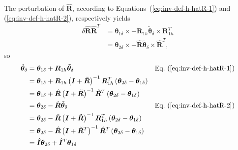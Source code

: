 \documentclass[10pt,dvips,fleqn,subeqn]{report}
\newcommand{\T}[1]{\bm{#1}}
\begin{document}
The perturbation of $\hat{\T{R}}$, according 
to Equations~(\ref{eq:inv-def-h-hatR-1}) and (\ref{eq:inv-def-h-hatR-2}),
respectively yields
\begin{align}
	\delta\hat{\T{R}} \hat{\T{R}}^T
	&= \T{\theta}_{1\delta} \times
		+ \T{R}_{1h} \tilde{\T{\theta}}_{\delta}\times \T{R}_{1h}^T \nonumber \\
	&= \T{\theta}_{2\delta} \times
		- \hat{\T{R}} \tilde{\T{\theta}}_{\delta}\times \hat{\T{R}}^T ,
\end{align}
so
\begin{align}
	\hat{\T{\theta}}_{\delta}
	&= \T{\theta}_{1\delta}
		+ \T{R}_{1h} \tilde{\T{\theta}}_{\delta}
		&& \text{Eq.~(\ref{eq:inv-def-h-hatR-1})} \nonumber \\
	&= \T{\theta}_{1\delta}
		+ \T{R}_{1h} \plbr{\T{I} + \tilde{\T{R}}}^{-1}
		\T{R}_{1h}^T \plbr{\T{\theta}_{2\delta} - \T{\theta}_{1\delta}} \nonumber \\
	&= \T{\theta}_{1\delta}
		+ \hat{\T{R}} \plbr{\T{I} + \tilde{\T{R}}}^{-1}
		\hat{\T{R}}^T \plbr{\T{\theta}_{2\delta} - \T{\theta}_{1\delta}} \nonumber \\
	&= \T{\theta}_{2\delta}
		- \hat{\T{R}} \tilde{\T{\theta}}_{\delta}
		&& \text{Eq.~(\ref{eq:inv-def-h-hatR-2})} \nonumber \\
	&= \T{\theta}_{2\delta}
		- \hat{\T{R}} \plbr{\T{I} + \tilde{\T{R}}}^{-1}
		\T{R}_{1h}^T \plbr{\T{\theta}_{2\delta} - \T{\theta}_{1\delta}} \nonumber \\
	&= \T{\theta}_{2\delta}
		- \hat{\T{R}} \plbr{\T{I} + \tilde{\T{R}}^T}^{-1}
		\hat{\T{R}}^T \plbr{\T{\theta}_{2\delta} - \T{\theta}_{1\delta}} \nonumber \\
	&= \hat{\T{I}} \T{\theta}_{2\delta}
		+ \hat{\T{I}}^T \T{\theta}_{1\delta}
\end{align}
\end{document}

